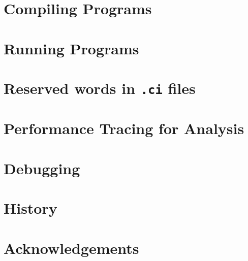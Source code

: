 \documentclass[10pt]{report}
\begin{document}
\chapter{Compiling \charm Programs}
\label{sec:compile}
  

\chapter{Running \charm Programs}
\label{sec:run}
  

\chapter{Reserved words in {\tt .ci} files}
\label{sec:keywords}
  

\chapter{Performance Tracing for Analysis}
\label{sec:trace-projections}
  

\chapter{Debugging}
  

\chapter{History}
  

\chapter {Acknowledgements}
  


\end{document}
